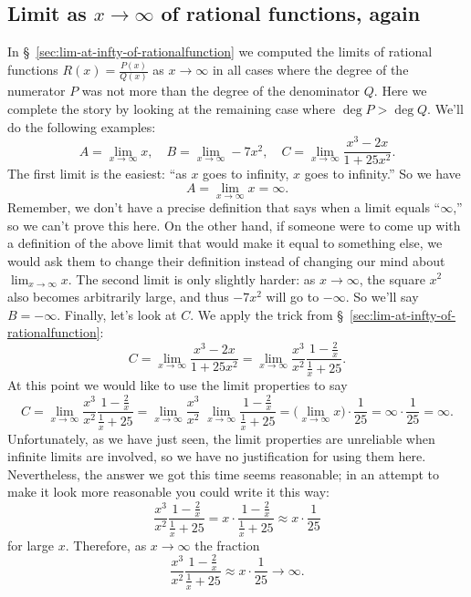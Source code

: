 \subsection{Limit as $x\to\infty$ of rational functions, again} 
\label{sec:03infinite-limit-of-rational-functions}
In \S~\ref{sec:lim-at-infty-of-rationalfunction} we computed the
limits of rational functions $R(x) = \frac{P(x)} {Q(x)}$ as
$x\to\infty$ in all cases where the degree of the numerator $P$ was
not more than the degree of the denominator $Q$.  Here we complete the
story by looking at the remaining case where $\deg P > \deg Q$.
We'll do the following examples:
\[
  A = \lim_{x\to\infty} x, \quad
  B = \lim_{x\to\infty} -7x^2, \quad
  C = \lim_{x\to\infty} \frac{x^3-2x} {1+25x^2}.
\]
The first limit is the easiest: ``as $x$ goes to infinity, $x$ goes to
infinity.''  So we have
\[
A = \lim_{x\to\infty} x = \infty.
\]
Remember, we don't have a precise definition that says when a limit
equals ``$\infty$,'' so we can't prove this here.  On the other hand,
if someone were to come up with a definition of the above limit that
would make it equal to something else, we would ask them to change
their definition instead of changing our mind about $\lim_{x\to\infty}
x$.
The second limit is only slightly harder: as $x\to\infty$, the square
$x^2$ also becomes arbitrarily large, and thus $-7x^2$ will go to
$-\infty$.  So we'll say  $B=-\infty$.
Finally, let's look at $C$.  We apply the trick from
\S~\ref{sec:lim-at-infty-of-rationalfunction}:
\[
C = \lim_{x\to\infty}  \frac{x^3-2x} {1+25x^2}
=  \lim_{x\to\infty} \frac{x^3} {x^2}  \frac{1-\frac2x} {\frac1x+25}.
\]
At this point we would like to use the limit properties to say
\[
C =  \lim_{x\to\infty} \frac{x^3} {x^2}  \frac{1-\frac2x} {\frac1x+25}
= \lim_{x\to\infty} \frac{x^3} {x^2}\; \lim_{x\to\infty}
\frac{1-\frac2x} {\frac1x+25}
=\bigl(\lim_{x\to\infty} x\bigr) \cdot \frac{1} {25}
=\infty \cdot \frac{1} {25}
=\infty.
\]
Unfortunately, as we have just seen, the limit properties are
unreliable when infinite limits are involved, so we have no
justification for using them here.  Nevertheless, the answer we got
this time seems reasonable; in an attempt to make it look more
reasonable you could write it this way:
\[
\frac{x^3} {x^2}  \frac{1-\frac2x} {\frac1x+25}
=x\cdot \frac{1-\frac2x}{\frac1x+25}
\approx x \cdot \frac{1} {25}
\]
for large $x$.  Therefore, as $x\to\infty$ the fraction
\[
\frac{x^3} {x^2}  \frac{1-\frac2x} {\frac1x+25}
\approx x \cdot \frac{1} {25}
\to\infty.
\]

